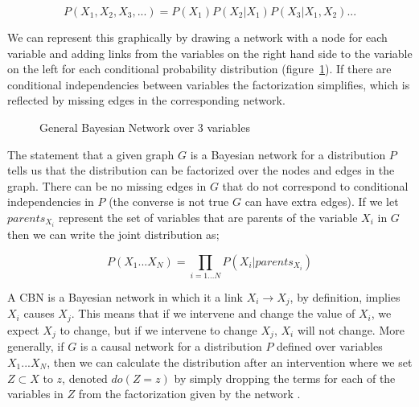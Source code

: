 \documentclass[11pt,a4paper]{article}
\begin{document}
\begin{equation}
P(X_{1},X_{2},X_{3},...)=P(X_{1})P(X_{2}|X_{1})P(X_{3}|X_{1},X_{2})...
\end{equation}

We can represent this graphically by drawing a network with a node for each variable and adding links from the variables on the right hand side to the variable on the left for each conditional probability distribution (figure~\ref{fig:bayesnet}). If there are conditional independencies between variables the factorization simplifies, which is reflected by missing edges in the corresponding network. 

\begin{figure}[h]
\centering
\caption{General Bayesian Network over 3 variables}
\label{fig:bayesnet}
\end{figure}

The statement that a given graph $G$ is a Bayesian network for a distribution $P$ tells us that the distribution can be factorized over the nodes and edges in the graph. There can be no missing edges in $G$ that do not correspond to conditional independencies in $P$ (the converse is not true $G$ can have extra edges). If we let $parents_{X_{i}}$ represent the set of variables that are parents of the variable $X_{i}$ in $G$ then we can write the joint distribution as; 

\begin{equation}
P(X_{1}...X_{N}) = \prod_{i = 1...N}P(X_{i}|parents_{X_{i}})
\end{equation}

A CBN is a Bayesian network in which it a link $X_{i} \rightarrow X_{j}$, by definition, implies $X_{i}$ causes $X_{j}$. This means that if we intervene and change the value of $X_{i}$, we expect $X_{j}$ to change, but if we intervene to change $X_{j}$, $X_{i}$ will not change. More generally, if $G$ is a causal network for a distribution $P$ defined over variables $X_{1}...X_{N}$, then we can calculate the distribution after an intervention where we set $Z \subset X$ to $z$, denoted $do(Z=z)$ by simply dropping the terms for each of the variables in $Z$ from the factorization given by the network \cite{Pearl2000}.
\end{document}
